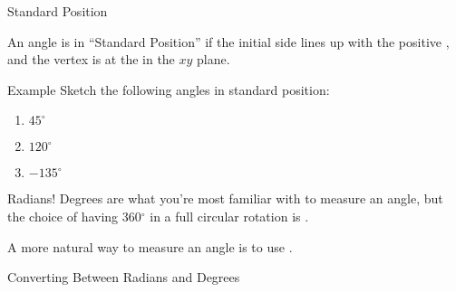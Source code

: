 \documentclass[presentation]{beamer}
\begin{document}
\begin{frame}[label={sec:orgfba14fa}]{Standard Position}
\begin{definition}
An angle is in ``Standard Position'' if the initial side lines up with the positive \uline{\hspace*{1in}},
and the vertex is at the \uline{\hspace*{1in}} in the \(xy\) plane.
\end{definition}

\vspace{10in}
\end{frame}
\begin{frame}[label={sec:org3792949}]{Example}
Sketch the following angles in standard position:
\begin{enumerate}
\item \(45^{\circ}\)
\item \(120^{\circ}\)
\item \(-135^{\circ}\)
\end{enumerate}


\vspace{10in}
\end{frame}

\begin{frame}[label={sec:orgae34f62}]{Radians!}
Degrees are what you're most familiar with to measure an angle, but
the choice of having 360\(^{\circ}\) in a full circular rotation is \uline{\hspace*{1in}}.

A more natural way to measure an angle is to use \uline{\hspace*{1in}}.


\vspace{10in}
\end{frame}

\begin{frame}[label={sec:org6551c26}]{Converting Between Radians and Degrees}
\begin{theorem}
\phantom{hi}
\[\]
\phantom{hi}
\end{theorem}

\vspace{10in}
\end{frame}
\end{document}

